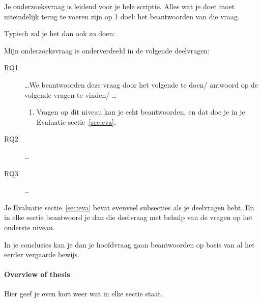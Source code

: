 Je onderzoeksvraag is leidend voor je hele scriptie. Alles wat je doet moet uiteindelijk terug te voeren zijn op 1 doel: het beantwoorden van die vraag. 

Typisch zal je het dan ook zo doen:

Mijn onderzoeksvraag is onderverdeeld in de volgende deelvragen:

\begin{description}
\item[RQ1] \ldots We   beantwoorden deze vraag  door het volgende te doen/ antwoord op de volgende vragen te vinden/ \ldots
\begin{enumerate}
\item Vragen op dit niveau kan je echt beantwoorden, en dat doe je in je Evaluatie sectie~\ref{sec:eva}.
\end{enumerate}
\item[RQ2] \ldots
\item[RQ3] \ldots
\end{description}

Je Evaluatie sectie~\ref{sec:eva} bevat evenveel subsecties als je deelvragen hebt. En in elke sectie beantwoord je dan die deelvraag met behulp van de vragen op het onderste niveau.

In je conclusies kan je dan je hoofdvraag gaan beantwoorden op basis van al het eerder vergaarde bewijs.


\paragraph{Overview of thesis}
Hier geef je even kort weer wat in elke sectie staat.
\fi



\newpage